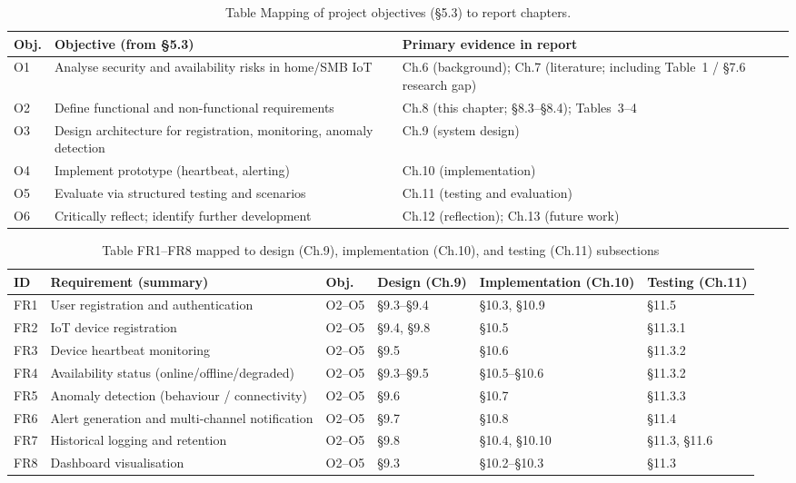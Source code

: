 \begin{table}[htbp]
  \centering
  \small
  \caption{Table  Mapping of project objectives (\S{}5.3) to report chapters.}
  \label{tab:ica2_4}
\begin{tabular}{p{}p{}p{}}
\toprule
Obj. & Objective (from \S{}5.3) & Primary evidence in report \\
\midrule
O1 & Analyse security and availability risks in home/SMB IoT & Ch.6 (background); Ch.7 (literature; including Table~1 / \S{}7.6 research gap) \\
O2 & Define functional and non-functional requirements & Ch.8 (this chapter; \S{}8.3--\S{}8.4); Tables~3--4 \\
O3 & Design architecture for registration, monitoring, anomaly detection & Ch.9 (system design) \\
O4 & Implement prototype (heartbeat, alerting) & Ch.10 (implementation) \\
O5 & Evaluate via structured testing and scenarios & Ch.11 (testing and evaluation) \\
O6 & Critically reflect; identify further development & Ch.12 (reflection); Ch.13 (future work) \\
\bottomrule
\end{tabular}
\end{table}

\begin{table}[htbp]
  \centering
  \small
  \caption{Table  FR1--FR8 mapped to design (Ch.9), implementation (Ch.10), and testing (Ch.11) subsections}
  \label{tab:ica2_5}
\begin{tabular}{p{}p{}p{}p{}p{}p{}}
\toprule
ID & Requirement (summary) & Obj. & Design (Ch.9) & Implementation (Ch.10) & Testing (Ch.11) \\
\midrule
FR1 & User registration and authentication & O2--O5 & \S{}9.3--\S{}9.4 & \S{}10.3, \S{}10.9 & \S{}11.5 \\
FR2 & IoT device registration & O2--O5 & \S{}9.4, \S{}9.8 & \S{}10.5 & \S{}11.3.1 \\
FR3 & Device heartbeat monitoring & O2--O5 & \S{}9.5 & \S{}10.6 & \S{}11.3.2 \\
FR4 & Availability status (online/offline/degraded) & O2--O5 & \S{}9.3--\S{}9.5 & \S{}10.5--\S{}10.6 & \S{}11.3.2 \\
FR5 & Anomaly detection (behaviour / connectivity) & O2--O5 & \S{}9.6 & \S{}10.7 & \S{}11.3.3 \\
FR6 & Alert generation and multi-channel notification & O2--O5 & \S{}9.7 & \S{}10.8 & \S{}11.4 \\
FR7 & Historical logging and retention & O2--O5 & \S{}9.8 & \S{}10.4, \S{}10.10 & \S{}11.3, \S{}11.6 \\
FR8 & Dashboard visualisation & O2--O5 & \S{}9.3 & \S{}10.2--\S{}10.3 & \S{}11.3 \\
\bottomrule
\end{tabular}
\end{table}

